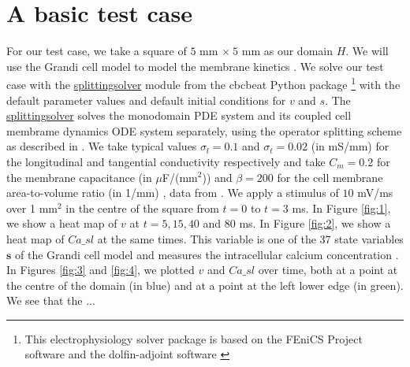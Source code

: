 \documentclass[12pt,a4paper]{article}
\begin{document}
\section{A basic test case} \label{A basic test case}
For our test case, we take a square of $5$ mm $\times\: 5$ mm as our domain $H$. We will use the Grandi cell model to model the membrane kinetics \cite{Grandi}. We solve our test case with the \url{splittingsolver} module from the cbcbeat Python package \cite{cbcbeat}\footnote{This electrophysiology solver package is based on the FEniCS Project software \cite{fenics} and the dolfin-adjoint software \cite{dolfin-adjoint}} with the default parameter values and default initial conditions for $v$ and $s$. The \url{splittingsolver} solves the monodomain PDE system and its coupled cell membrame dynamics ODE system separately, using the operator splitting scheme as described in \cite{Sundnes}. We take typical values $\sigma_l=0.1$ and $\sigma_t=0.02$ (in mS/mm) for the longitudinal and tangential conductivity respectively and take $C_m=0.2$ for the membrane capacitance (in $\mu$F/(mm$^2$)) and $\beta=200$ for the cell membrane area-to-volume ratio (in 1/mm) \cite{Roth}, data from \cite{Plonsey1882, Plonsey1984}.
We apply a stimulus of $10$ mV/ms over 1 mm$^2$ in the centre of the square from $t=0$ to $t=3$ ms. In Figure \ref{fig:1}, we show a heat map of $v$ at $t=5, 15, 40$ and $80$ ms. In Figure \ref{fig:2}, we show a heat map of $Ca\_sl$ at the same times. This variable is one of the 37 state variables $\mathbf{s}$ of the Grandi cell model and measures the intracellular calcium concentration \cite{Grandi}. In Figures \ref{fig:3} and \ref{fig:4}, we plotted $v$ and $Ca\_sl$ over time, both at a point at the centre of the domain (in blue) and at a point at the left lower edge (in green). We see that the ...

\end{document}
